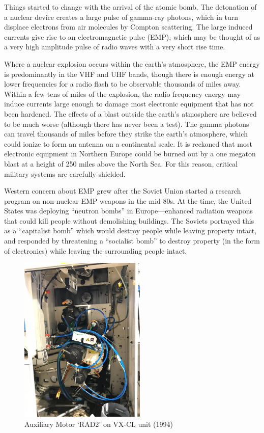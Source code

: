 \documentclass[10pt,journal,compsoc]{IEEEtran}
\begin{document}
Things started to change with the arrival of the atomic bomb. The detonation of a
nuclear device creates a large pulse of gamma-ray photons, which in turn displace
electrons from air molecules by Compton scattering. The large induced currents give
rise to an electromagnetic pulse (EMP), which may be thought of as a very high amplitude
pulse of radio waves with a very short rise time.

Where a nuclear explosion occurs within the earth’s atmosphere, the EMP energy is
predominantly in the VHF and UHF bands, though there is enough energy at lower frequencies
for a radio flash to be observable thousands of miles away. Within a few tens
of miles of the explosion, the radio frequency energy may induce currents large enough
to damage most electronic equipment that has not been hardened. The effects of a blast
outside the earth’s atmosphere are believed to be much worse (although there has never
been a test). The gamma photons can travel thousands of miles before they strike the
earth’s atmosphere, which could ionize to form an antenna on a continental scale. It is
reckoned that most electronic equipment in Northern Europe could be burned out by a one megaton
blast at a height of 250 miles above the North Sea. For this reason, critical
military systems are carefully shielded.

Western concern about EMP grew after the Soviet Union started a research program
on non-nuclear EMP weapons in the mid-80s. At the time, the United States was deploying
“neutron bombs” in Europe—enhanced radiation weapons that could kill people without
demolishing buildings. The Soviets portrayed this as a “capitalist bomb”
which would destroy people while leaving property intact, and responded by threatening
a “socialist bomb” to destroy property (in the form of electronics) while leaving the
surrounding people intact.

\begin{figure}%
    \centering
    \includegraphics[width=6cm]{bnw4607ouds51}
    \caption{Auxiliary Motor ‘RAD2’ on VX-CL unit (1994)}
    \label{fig:1}
\end{figure}
\end{document}
